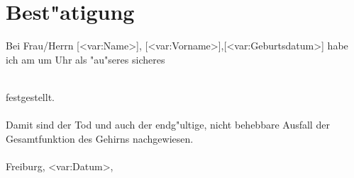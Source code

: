 \documentclass[a4]{scrreprt}
\begin{document}
\setcounter{secnumdepth}{0}
\section{Best"atigung}

\noindent
Bei Frau/Herrn [<var:Name>],  [<var:Vorname>],[<var:Geburtsdatum>] habe ich am  um  Uhr als "au"seres sicheres \\ \\
\begin{env2} \end{env2} 
festgestellt. \\ \\

\noindent
Damit sind der Tod und auch der endg"ultige, nicht behebbare Ausfall der Gesamtfunktion des Gehirns nachgewiesen. \\ \\

\noindent
Freiburg, <var:Datum>, \hfill {}
\end{document}
